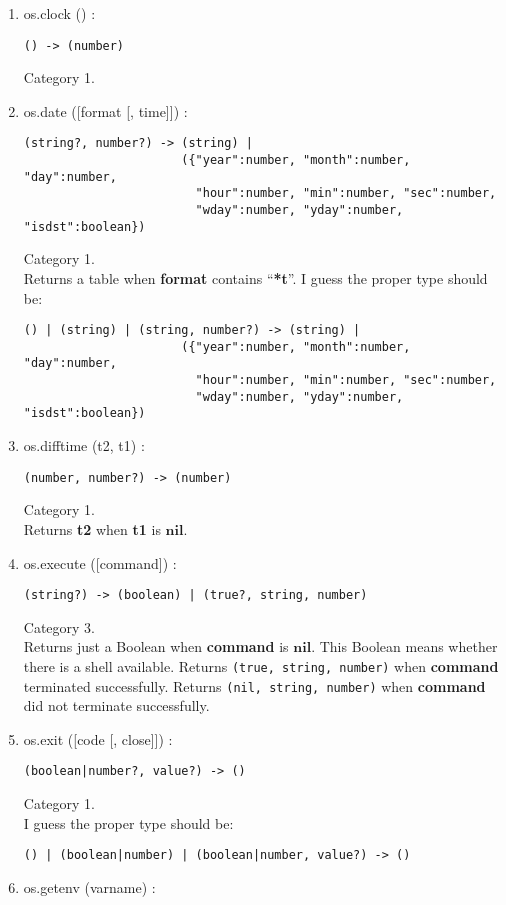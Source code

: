 \documentclass{paper}
\newcommand{\Nil}{\mathbf{nil}}
\begin{document}
\begin{enumerate}
\item os.clock () :
\begin{verbatim}
() -> (number)
\end{verbatim}
Category 1.
\item os.date ([format [, time]]) :
\begin{verbatim}
(string?, number?) -> (string) |
                      ({"year":number, "month":number, "day":number,
                        "hour":number, "min":number, "sec":number,
                        "wday":number, "yday":number, "isdst":boolean})
\end{verbatim}
Category 1.
\\
Returns a table when \textbf{format} contains ``\textbf{*t}''.
I guess the proper type should be:
\begin{verbatim}
() | (string) | (string, number?) -> (string) |
                      ({"year":number, "month":number, "day":number,
                        "hour":number, "min":number, "sec":number,
                        "wday":number, "yday":number, "isdst":boolean})
\end{verbatim}
\item os.difftime (t2, t1) :
\begin{verbatim}
(number, number?) -> (number)
\end{verbatim}
Category 1.
\\
Returns \textbf{t2} when \textbf{t1} is $\Nil$.
\item os.execute ([command]) :
\begin{verbatim}
(string?) -> (boolean) | (true?, string, number)
\end{verbatim}
Category 3.
\\
Returns just a Boolean when \textbf{command} is $\Nil$.
This Boolean means whether there is a shell available.
Returns \texttt{(true, string, number)} when
\textbf{command} terminated successfully.
Returns \texttt{(nil, string, number)} when
\textbf{command} did not terminate successfully.
\item os.exit ([code [, close]]) :
\begin{verbatim}
(boolean|number?, value?) -> ()
\end{verbatim}
Category 1.
\\
I guess the proper type should be:
\begin{verbatim}
() | (boolean|number) | (boolean|number, value?) -> ()
\end{verbatim}
\item os.getenv (varname) :

\end{enumerate}
\end{document}
